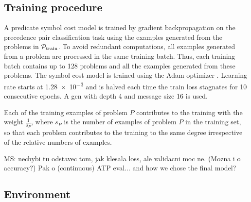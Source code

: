 \subsection{Training procedure}

A predicate symbol cost model is trained by gradient backpropagation
on the precedence pair classification task
using the examples generated from the problems in $\operatorname{\mathcal{P}_{\mathrm{train}}}$.
To avoid redundant computations, all examples generated from a problem are processed in the same training batch.
Thus, each training batch contains up to \num{128} problems and all the examples generated from these problems.
The symbol cost model is trained using the Adam optimizer \cite{Kingma2014}.
Learning rate starts at \num{1.28e-3}
and is halved each time the train loss stagnates for 10 consecutive epochs.
A \gls{gcn} with depth 4 and message size 16 is used.

Each of the training examples of problem $P$ contributes to the training with the weight $\frac{1}{s_P}$,
where $s_P$ is the number of examples of problem $P$ in the training set,
so that each problem contributes to the training to the same degree irrespective of the relative numbers of examples.

MS: nechybi tu odstavec tom, jak klesala loss, ale validacni moc ne.
(Mozna i o accuracy?) Pak o (continuous) ATP eval...
and how we chose the final model?

\subsection{Environment}

